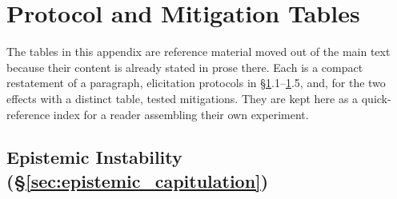 \section{Protocol and Mitigation Tables}
\label{sec:appendix_protocols}

The tables in this appendix are reference material moved out of the main text because their content is already stated in prose there. Each is a compact restatement of a paragraph, elicitation protocols in \S\ref{sec:appendix_protocols}.1--\ref{sec:appendix_protocols}.5, and, for the two effects with a distinct table, tested mitigations. They are kept here as a quick-reference index for a reader assembling their own experiment.

\subsection{Epistemic Instability (\S\ref{sec:epistemic_capitulation})}
\label{sec:appendix_protocols_epistemic}

